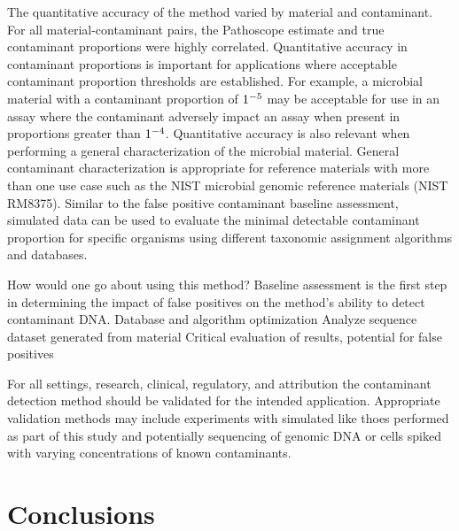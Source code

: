 \documentclass[fleqn,10pt,lineno]{wlpeerj}\usepackage[]{graphicx}\usepackage[]{color}
\begin{document}
The quantitative accuracy of the method varied by material and contaminant.
For all material-contaminant pairs, the Pathoscope estimate and true contaminant proportions were highly correlated.
Quantitative accuracy in contaminant proportions is important for applications where acceptable contaminant proportion thresholds are established.
For example, a microbial material with a contaminant proportion of $1 \time 10^{-5}$ may be acceptable for use in an assay where the contaminant adversely impact an assay when present in proportions greater than $1 \time 10^{-4}$.
Quantitative accuracy is also relevant when performing a general characterization of the microbial material.
General contaminant characterization is appropriate for reference materials with more than one use case such as the NIST microbial genomic reference materials (NIST RM8375)\citep{olson2016pepr}.
Similar to the false positive contaminant baseline assessment,
simulated data can be used to evaluate the minimal detectable contaminant proportion for specific organisms using different taxonomic assignment algorithms and databases.


How would one go about using this method?
Baseline assessment is the first step in determining the impact of false positives on the method's ability to detect contaminant DNA.
Database and algorithm optimization
Analyze sequence dataset generated from material
Critical evaluation of results, potential for false positives

For all settings, research, clinical, regulatory, and attribution the contaminant detection method should be validated for the intended application.
Appropriate validation methods may include experiments with simulated like thoes performed as part of this study and potentially sequencing of genomic DNA or cells spiked with varying concentrations of known contaminants.

\section*{Conclusions}

\end{document}
